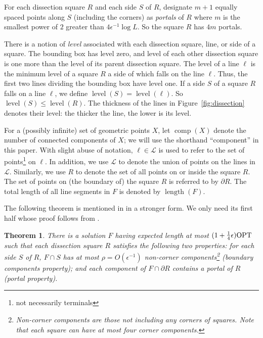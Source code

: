 \documentclass[extras,11pt]{article} \usepackage{fullpage}
\theoremstyle{mytheorem}
\newtheorem{theorem}{Theorem}
\DeclareMathOperator{\len}{length}
\DeclareMathOperator{\lev}{level}
\DeclareMathOperator{\comp}{comp}
\newcommand{\eps}{\epsilon}
\newcommand{\eL}{\mathcal{L}}
\newcommand{\OPT}{\mbox{\rm OPT}}
\begin{document}
For each dissection square $R$ and each side $S$ of $R$,
designate $m+1$ equally spaced points along $S$ (including the corners) as \emph{portals} of $R$ where $m$ is the smallest power of $2$ greater than $4\epsilon^{-1}\log L$.
So the square $R$ has $4m$ portals.


There is a notion of \emph{level} associated with each dissection square, line, or side of a square.
The bounding box has level zero, and level of each other dissection square is one more than the level of its parent dissection square.
The level of a line $\ell$ is the minimum level of a square $R$ a side of which falls on the line $\ell$.
Thus, the first two lines dividing the bounding box have level one.
If a side $S$ of a square $R$ falls on a line $\ell$, we define $\lev(S)=\lev(\ell)$.
So $\lev(S) \leq \lev(R)$.  The thickness of the lines in Figure~\ref{fig:dissection} denotes their level:
the thicker the line, the lower is its level.

For a (possibly infinite) set of geometric points $X$, let $\comp(X)$ denote the number of connected components of $X$;
we will use the shorthand ``component'' in this paper.
With slight abuse of notation, $\ell\in\eL$ is used to refer to the set of points\footnote{not necessarily terminals} on $\ell$.
In addition, we use $\eL$ to denote the union of points on the lines in $\eL$.
Similarly, we use $R$ to denote the set of all points on or inside the square $R$.
The set of points on (the boundary of) the square $R$ is referred to by $\partial R$.
The total length of all line segments in $F$ is denoted by $\len(F)$.




The following theorem is mentioned in \cite{BKM08:euc-for} in a stronger form.
We only need its first half  whose proof follows from \cite{arora98:ptas}.
\begin{theorem}{\cite{BKM08:euc-for}}
\label{thm:twoprops}
There is a solution $F$ having expected length at most $(1+\frac{1}{4}\epsilon)\OPT$ such that each dissection square $R$ satisfies the following two properties:
for each side $S$ of $R$, $F\cap S$ has at most $\rho=O(\eps^{-1})$ non-corner components\footnote{Non-corner components are those not including any corners of squares.  Note that each square can have at most four corner components.} (\emph{boundary components property}); and
each component of $F\cap\partial R$ contains a portal of $R$ (\emph{portal property}).
\end{theorem}
\end{document}
